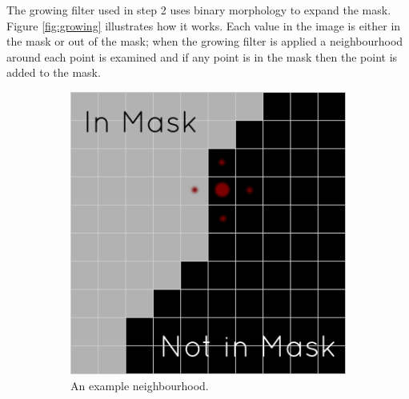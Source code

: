 The growing filter used in step 2 uses binary morphology to expand the mask. Figure \ref{fig:growing} illustrates how it works. Each value in the image is either in the mask or out of the mask; when the growing filter is applied a neighbourhood around each point is examined and if any point is in the mask then the point is added to the mask.

\begin{figure}[H]
  \centering
  \begin{subfigure}[b]{0.5\textwidth}
    \includegraphics[width=\textwidth]{images/erosion/growing_1.png}
    \caption{An example neighbourhood.}\label{fig:growing_1}
  \end{subfigure}%
  ~ %
  \begin{subfigure}[b]{0.5\textwidth}

\end{subfigure}
\end{figure}
